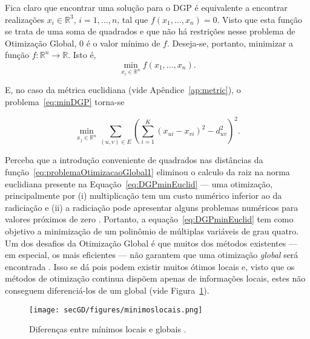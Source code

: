 Fica claro que encontrar uma solução para o DGP é equivalente a encontrar realizações $x_i \in \mathbb{R}^3$, $i=1,\dots,n$, tal que $f(x_1,\dots,x_n) = 0$. Visto que esta função se trata de uma soma de quadrados e que não há restrições nesse problema de Otimização Global, 0 é o valor mínimo de $f$. Deseja-se, portanto, minimizar a função $f: \mathbb{R}^n \longrightarrow \mathbb{R}$. Isto é,
\begin{equation}
	\label{eq:minDGP}
	\min_{x_i \in \mathbb{R}^n} f(x_1,\dots,x_n).
\end{equation}

E, no caso da métrica euclidiana (vide Apêndice~\ref{ap:metric}), o problema~\ref{eq:minDGP} torna-se

\begin{equation}
 \min_{x_j \in \mathbb{R}^n} \sum_{(u,v)\in E} \left(\sum_{i=1}^{K}(x_{ui} - x_{vi})^2 - d_{uv}^2\right)^2.
 \label{eq:DGPminEuclid}
\end{equation}

Perceba que a introdução conveniente de quadrados nas distâncias da função~\ref{eq:problemaOtimizacaoGlobal1} eliminou o calculo da raiz na norma euclidiana presente na Equação~\ref{eq:DGPminEuclid} --- uma otimização, principalmente por (i) multiplicação tem um custo numérico inferior ao da radiciação \cite{intructionsTableFog} e (ii) a radiciação pode apresentar alguns problemas numéricos para valores próximos de zero \cite{libertiMdgpContinousToDiscrete}. Portanto, a equação~\ref{eq:DGPminEuclid} tem como objetivo a minimização de um polinômio de múltiplas variáveis de grau quatro.
\\

Um dos desafios da Otimização Global é que muitos dos métodos existentes --- em especial, os mais eficientes --- não garantem que uma otimização \textit{global} será encontrada . Isso se dá pois podem existir muitos ótimos locais e, visto que os métodos de otimização continua dispõem apenas de informações locais, estes não conseguem diferenciá-los de um global \cite{carlileBook31Coloquio} (vide Figura~\ref{fig:minimoslocais}). %
\begin{figure}[H]
	\begin{center}
		\texttt{[image: secGD/figures/minimoslocais.png]}
	\end{center}
	\caption{Diferenças entre mínimos locais e globais \cite{carlileBook31Coloquio}.}
	\label{fig:minimoslocais}
\end{figure}

